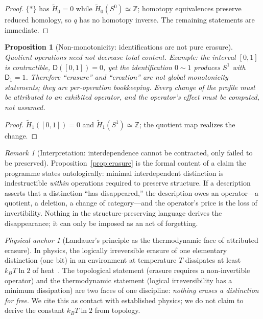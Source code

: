 \documentclass[11pt,a4paper]{article}
\newtheorem{proposition}[theorem]{Proposition}
\theoremstyle{definition}
\theoremstyle{remark}
\newtheorem{remark}[theorem]{Remark}
\newtheorem{anchor}[theorem]{Physical anchor}
\newcommand{\Szero}{S^{0}}
\newcommand{\Sone}{S^{1}}
\newcommand{\Z}{\mathbb{Z}}
\newcommand{\rH}{\widetilde H}
\newcommand{\Dd}{\mathsf{D}}
\begin{document}
\begin{proof}
$\{*\}$ has $\rH_{0}=0$ while $\rH_{0}(\Szero)\simeq\Z$; homotopy equivalences preserve reduced
homology, so $q$ has no homotopy inverse.  The remaining statements are immediate.
\end{proof}

\begin{proposition}[Non-monotonicity: identifications are not pure erasure]
\label{prop:nonmonotone}
Quotient operations need not decrease total content.  Example: the interval $[0,1]$ is
contractible, $\Dd([0,1])=0$, yet the identification $0\sim1$ produces $\Sone$ with
$\Dd_{1}=1$.  Therefore ``erasure'' and ``creation'' are not global monotonicity statements;
they are \emph{per-operation bookkeeping}.  Every change of the profile must be attributed to an
exhibited operator, and the operator's effect must be computed, not assumed.
\end{proposition}

\begin{proof}
$\rH_{1}([0,1])=0$ and $\rH_{1}(\Sone)\simeq\Z$; the quotient map realizes the change.
\end{proof}

\begin{remark}[Interpretation: interdependence cannot be contracted, only failed to be preserved]
Proposition~\ref{prop:erasure} is the formal content of a claim the programme states
ontologically: minimal interdependent distinction is indestructible \emph{within} operations
required to preserve structure.  If a description asserts that a distinction ``has
disappeared,'' the description owes an operator---a quotient, a deletion, a change of
category---and the operator's price is the loss of invertibility.  Nothing in the
structure-preserving language derives the disappearance; it can only be imposed as an act of
forgetting.
\end{remark}

\begin{anchor}[Landauer's principle as the thermodynamic face of attributed erasure]
\label{anchor:landauer}
In physics, the logically irreversible erasure of one elementary distinction (one bit) in an
environment at temperature $T$ dissipates at least $k_{B}T\ln2$ of
heat~\cite{Landauer1961,Bennett1982}.  The topological statement (erasure requires a
non-invertible operator) and the thermodynamic statement (logical irreversibility has a minimum
dissipation) are two faces of one discipline: \emph{nothing erases a distinction for free}.  We
cite this as contact with established physics; we do not claim to derive the constant
$k_{B}T\ln2$ from topology.
\end{anchor}
\end{document}
